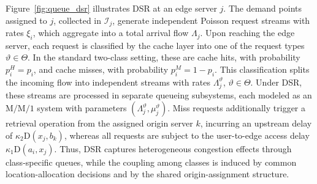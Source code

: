 \documentclass[a4paper,11pt,reqno]{amsart}
\newcommand{\D}{\mathrm{D}}
\begin{document}
Figure~\ref{fig:queue_dsr} illustrates DSR at an edge server $j$. The demand points assigned to $j$, collected in $\mathcal I_j$, generate independent Poisson request streams with rates $\xi_i$, which aggregate into a total arrival flow $\Lambda_j$. Upon reaching the edge server, each request is classified by the cache layer into one of the request types $\vartheta\in\Theta$. In the standard two-class setting, these are cache hits, with probability $p_i^H=p_i$, and cache misses, with probability $p_i^M=1-p_i$. This classification splits the incoming flow into independent streams with rates $\Lambda_j^\vartheta$, $\vartheta\in\Theta$. Under DSR, these streams are processed in separate queueing subsystems, each modeled as an $\mathrm{M}/\mathrm{M}/1$ system with parameters $(\Lambda_j^\vartheta,\mu_j^\vartheta)$. Miss requests additionally trigger a retrieval operation from the assigned origin server $k$, incurring an upstream delay of $\kappa_2 \D(x_j,b_k)$, whereas all requests are subject to the user-to-edge access delay $\kappa_1 \D(a_i,x_j)$.
Thus, DSR captures heterogeneous congestion effects through class-specific queues, while the coupling among classes is induced by common location-allocation decisions and by the shared origin-assignment structure.
\end{document}
